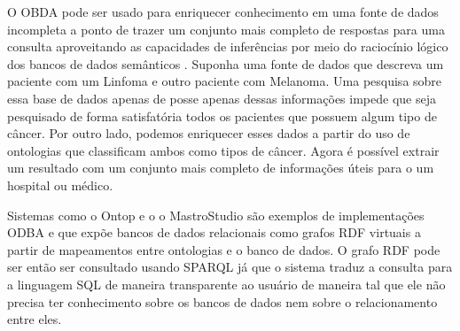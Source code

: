 O OBDA pode ser usado para enriquecer conhecimento em uma fonte de dados incompleta a ponto de trazer um conjunto mais completo de respostas para uma consulta aproveitando as capacidades de inferências por meio do raciocínio lógico dos bancos de dados semânticos \citep{Bienvenu2013, Calvanese2016}. Suponha uma fonte de dados que descreva um paciente com um Linfoma e outro paciente com Melanoma. Uma pesquisa sobre essa base de dados apenas de posse apenas dessas informações impede que seja pesquisado de forma satisfatória todos os pacientes que possuem algum tipo de câncer. Por outro lado, podemos enriquecer esses dados a partir do uso de ontologias que classificam ambos como tipos de câncer. Agora é possível extrair um resultado com um conjunto mais completo de informações úteis para o um hospital ou médico.

Sistemas como o Ontop \citep{Calvanese2016} e o o MastroStudio \citep{Civili2013} são exemplos de implementações ODBA e que expõe bancos de dados relacionais como grafos RDF virtuais a partir de mapeamentos entre ontologias e o banco de dados. O grafo RDF pode ser então ser consultado usando SPARQL já que o sistema traduz a consulta para a linguagem SQL de maneira transparente ao usuário de maneira tal que ele não precisa ter conhecimento sobre os bancos de dados nem sobre o relacionamento entre eles.











